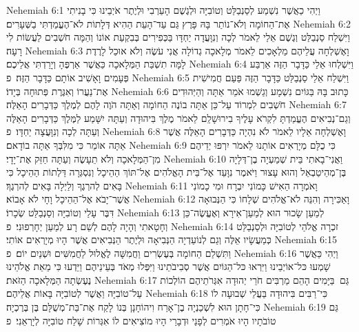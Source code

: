 Nehemiah 6:1	וַיְהִי כַאֲשֶׁר נִשְׁמַע לְסַנְבַלַּט וְטוֹבִיָּה וּלְגֶשֶׁם הָעַרְבִי וּלְיֶתֶר אֹיְבֵינוּ כִּי בָנִיתִי אֶת־הַחוֹמָה וְלֹא־נוֹתַר בָּהּ פָּרֶץ גַּם עַד־הָעֵת הַהִיא דְּלָתוֹת לֹא־הֶעֱמַדְתִּי בַשְּׁעָרִים׃
Nehemiah 6:2	וַיִּשְׁלַח סַנְבַלַּט וְגֶשֶׁם אֵלַי לֵאמֹר לְכָה וְנִוָּעֲדָה יַחְדָּו בַּכְּפִירִים בְּבִקְעַת אוֹנוֹ וְהֵמָּה חֹשְׁבִים לַעֲשׂוֹת לִי רָעָה׃
Nehemiah 6:3	וָאֶשְׁלְחָה עֲלֵיהֶם מַלְאָכִים לֵאמֹר מְלָאכָה גְדוֹלָה אֲנִי עֹשֶׂה וְלֹא אוּכַל לָרֶדֶת לָמָּה תִשְׁבַּת הַמְּלָאכָה כַּאֲשֶׁר אַרְפֶּהָ וְיָרַדְתִּי אֲלֵיכֶם׃
Nehemiah 6:4	וַיִּשְׁלְחוּ אֵלַי כַּדָּבָר הַזֶּה אַרְבַּע פְּעָמִים וָאָשִׁיב אוֹתָם כַּדָּבָר הַזֶּה׃ {פ}
Nehemiah 6:5	וַיִּשְׁלַח אֵלַי סַנְבַלַּט כַּדָּבָר הַזֶּה פַּעַם חֲמִישִׁית אֶת־נַעֲרוֹ וְאִגֶּרֶת פְּתוּחָה בְּיָדוֹ׃
Nehemiah 6:6	כָּתוּב בָּהּ בַּגּוֹיִם נִשְׁמָע וְגַשְׁמוּ אֹמֵר אַתָּה וְהַיְּהוּדִים חֹשְׁבִים לִמְרוֹד עַל־כֵּן אַתָּה בוֹנֶה הַחוֹמָה וְאַתָּה הֹוֶה לָהֶם לְמֶלֶךְ כַּדְּבָרִים הָאֵלֶּה׃
Nehemiah 6:7	וְגַם־נְבִיאִים הֶעֱמַדְתָּ לִקְרֹא עָלֶיךָ בִירוּשָׁלַ͏ִם לֵאמֹר מֶלֶךְ בִּיהוּדָה וְעַתָּה יִשָּׁמַע לַמֶּלֶךְ כַּדְּבָרִים הָאֵלֶּה וְעַתָּה לְכָה וְנִוָּעֲצָה יַחְדָּו׃ {פ}
Nehemiah 6:8	וָאֶשְׁלְחָה אֵלָיו לֵאמֹר לֹא נִהְיָה כַּדְּבָרִים הָאֵלֶּה אֲשֶׁר אַתָּה אוֹמֵר כִּי מִלִּבְּךָ אַתָּה בוֹדָאם׃
Nehemiah 6:9	כִּי כֻלָּם מְיָרְאִים אוֹתָנוּ לֵאמֹר יִרְפּוּ יְדֵיהֶם מִן־הַמְּלָאכָה וְלֹא תֵעָשֶׂה וְעַתָּה חַזֵּק אֶת־יָדָי׃
Nehemiah 6:10	וַאֲנִי־בָאתִי בֵּית שְׁמַעְיָה בֶן־דְּלָיָה בֶּן־מְהֵיטַבְאֵל וְהוּא עָצוּר וַיֹּאמֶר נִוָּעֵד אֶל־בֵּית הָאֱלֹהִים אֶל־תּוֹךְ הַהֵיכָל וְנִסְגְּרָה דַּלְתוֹת הַהֵיכָל כִּי בָּאִים לְהרְגֶךָ וְלַיְלָה בָּאִים לְהרְגֶךָ׃
Nehemiah 6:11	וָאֹמְרָה הַאִישׁ כָּמוֹנִי יִבְרָח וּמִי כָמוֹנִי אֲשֶׁר־יָבֹא אֶל־הַהֵיכָל וָחָי לֹא אָבוֹא׃
Nehemiah 6:12	וָאַכִּירָה וְהִנֵּה לֹא־אֱלֹהִים שְׁלָחוֹ כִּי הַנְּבוּאָה דִּבֶּר עָלַי וְטוֹבִיָּה וְסַנְבַלַּט שְׂכָרוֹ׃
Nehemiah 6:13	לְמַעַן שָׂכוּר הוּא לְמַעַן־אִירָא וְאֶעֱשֶׂה־כֵּן וְחָטָאתִי וְהָיָה לָהֶם לְשֵׁם רָע לְמַעַן יְחָרְפוּנִי׃ {פ}
Nehemiah 6:14	זכְרָה אֱלֹהַי לְטוֹבִיָּה וּלְסַנְבַלַּט כְּמַעֲשָׂיו אֵלֶּה וְגַם לְנוֹעַדְיָה הַנְּבִיאָה וּלְיֶתֶר הַנְּבִיאִים אֲשֶׁר הָיוּ מְיָרְאִים אוֹתִי׃
Nehemiah 6:15	וַתִּשְׁלַם הַחוֹמָה בְּעֶשְׂרִים וַחֲמִשָּׁה לֶאֱלוּל לַחֲמִשִּׁים וּשְׁנַיִם יוֹם׃ {פ}
Nehemiah 6:16	וַיְהִי כַּאֲשֶׁר שָׁמְעוּ כּל־אוֹיְבֵינוּ וַיִּרְאוּ כּל־הַגּוֹיִם אֲשֶׁר סְבִיבֹתֵינוּ וַיִּפְּלוּ מְאֹד בְּעֵינֵיהֶם וַיֵּדְעוּ כִּי מֵאֵת אֱלֹהֵינוּ נֶעֶשְׂתָה הַמְּלָאכָה הַזֹּאת׃
Nehemiah 6:17	גַּם  בַּיָּמִים הָהֵם מַרְבִּים חֹרֵי יְהוּדָה אִגְּרֹתֵיהֶם הוֹלְכוֹת עַל־טוֹבִיָּה וַאֲשֶׁר לְטוֹבִיָּה בָּאוֹת אֲלֵיהֶם׃
Nehemiah 6:18	כִּי־רַבִּים בִּיהוּדָה בַּעֲלֵי שְׁבוּעָה לוֹ כִּי־חָתָן הוּא לִשְׁכַנְיָה בֶן־אָרַח וִיהוֹחָנָן בְּנוֹ לָקַח אֶת־בַּת־מְשֻׁלָּם בֶּן בֶּרֶכְיָה׃
Nehemiah 6:19	גַּם טוֹבֹתָיו הָיוּ אֹמְרִים לְפָנַי וּדְבָרַי הָיוּ מוֹצִיאִים לוֹ אִגְּרוֹת שָׁלַח טוֹבִיָּה לְיָרְאֵנִי׃ {פ}
